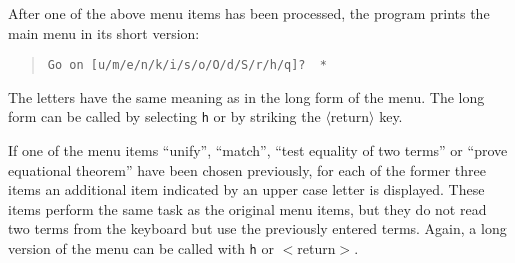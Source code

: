 \label{ShortMainMenu}
After one of the above menu items has been processed, the program
prints the main menu in its short version:
\begin{quote}
\begin{verbatim}
Go on [u/m/e/n/k/i/s/o/O/d/S/r/h/q]?  *
\end{verbatim}
\end{quote}
The letters have the same meaning as in the long form of the menu.
The long form can be called by selecting {\tt h} or by striking
the $\langle$return$\rangle$ key.

If one of the menu items ``unify'', ``match'', ``test equality of two terms''
or ``prove equational theorem''
have been chosen previously, for each of the former three items an additional
item indicated by an upper case letter is displayed. These
items perform the same task as the original menu items, but they 
do not read two terms from the keyboard but use the previously
entered terms. Again, a long 
version of the menu can be called with {\tt h} or $<$return$>$.

